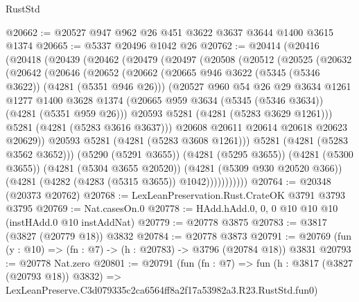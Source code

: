 \begin{lexlean}{RustStd}
\begin{coremodule}
@20662 := @20527 @947 @962 @26 @451 @3622 @3637 @3644 @1400 @3615 @1374
@20665 := @5337 @20496 @1042 @26
@20762 := @20414
    (@20416
      (@20418
        (@20439
          (@20462
            (@20479
              (@20497
                (@20508
                  (@20512
                    (@20525
                      (@20632
                        (@20642
                          (@20646
                            (@20652
                              (@20662
                                (@20665 @946 @3622 (@5345 (@5346 @3622)) (@4281 (@5351 @946 @26)))
                                (@20527
                                  @960
                                  @54
                                  @26
                                  @29
                                  @3634
                                  @1261
                                  @1277
                                  @1400
                                  @3628
                                  @1374
                                  (@20665 @959 @3634 (@5345 (@5346 @3634)) (@4281 (@5351 @959 @26)))
                                  @20593
                                  @5281
                                  (@4281 (@5283 @3629 @1261)))
                                @5281
                                (@4281 (@5283 @3616 @3637)))
                              @20608
                              @20611
                              @20614
                              @20618
                              @20623
                              @20629))
                          @20593
                          @5281
                          (@4281 (@5283 @3608 @1261)))
                        @5281
                        (@4281 (@5283 @3562 @3652)))
                      (@5290 (@5291 @3655))
                      (@4281 (@5295 @3655))
                      (@4281 (@5300 @3655))
                      (@4281 (@5304 @3655 @20520))
                      (@4281 (@5309 @930 @20520 @366))
                      (@4281 (@4282 (@4283 (@5315 @3655)) @1042)))))))))))
@20764 := @20348 (@20373 @20762)
@20768 := LexLeanPreservation.Rust.CrateOK @3791 @3793 @3795
@20769 := Nat.casesOn.{0}
@20778 := HAdd.hAdd.{0, 0, 0} @10 @10 @10 (instHAdd.{0} @10 instAddNat)
@20779 := @20778 @3875
@20783 := @3817 (@3827 (@20779 @18)) @3832
@20784 := @20778 @3873
@20791 := @20769 (fun (y : @10) => (fn : @7) -> (h : @20783) -> @3796 (@20784 @18)) @3831
@20793 := @20778 Nat.zero
@20801 := @20791
    (fun (fn : @7) =>
    fun (h : @3817 (@3827 (@20793 @18)) @3832) =>
    LexLeanPreserve.C3d079335c2ca6564ff8a2f17a53982a3.R23.RustStd.fun0)

\end{coremodule}
\end{lexlean}
